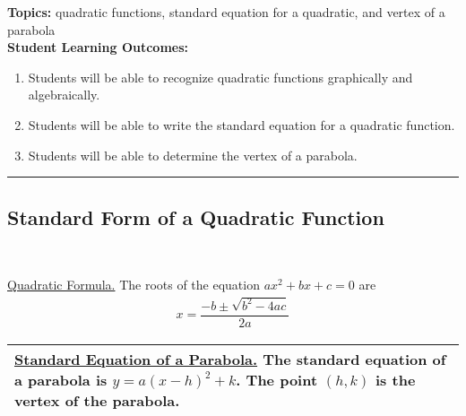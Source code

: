 

\noindent \textbf{Topics:}  quadratic functions, standard equation for  a quadratic, and vertex of a parabola\\

\noindent \textbf{Student Learning Outcomes:}
\begin{enumerate}
\item Students will be able to recognize quadratic functions graphically and algebraically.
\item Students will be able to write the standard equation for a quadratic function.
\item Students will be able to determine the vertex of a parabola.
\end{enumerate}

\hrule 

\bigskip

\subsection{Standard Form of a Quadratic Function} ~

\noindent \underline{Quadratic Formula.} The roots of the equation $ax^2+bx+c=0$ are \\
\begin{eqnarray}
  x = \dfrac{-b \pm \sqrt{b^2-4ac}}{2a}
\end{eqnarray}

\hspace{-.3in}\begin{tabular}{| p{} |} \hline 
\noindent \underline{Standard Equation of a Parabola.}
The standard equation of a parabola is 
$ y = a(x-h)^2 + k$. The point $(h,k)$ is the vertex of the parabola.
\\ \hline
\end{tabular} 

